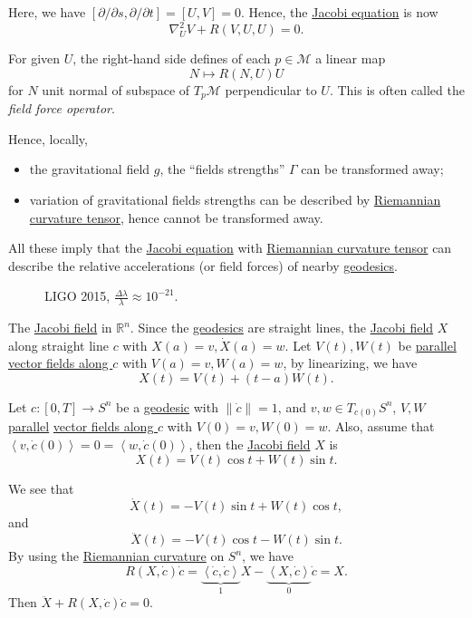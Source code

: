 Here, we have \([\partial / \partial s, \partial / \partial t] = [U, V] = 0 \). Hence, the \hyperref[eq:Jacobi]{Jacobi equation} is now
\[
	\nabla ^2_U V + R(V, U, U) = 0.
\]

For given \(U\), the right-hand side defines of each \(p\in \mathcal{M} \) a linear map
\[
	N \mapsto R(N, U)U
\]
for \(N\) unit normal of subspace of \(T_p \mathcal{M} \) perpendicular to \(U\). This is often called the \emph{field force operator}.

Hence, locally,
\begin{itemize}
	\item the gravitational field \(g\), the ``fields strengths'' \(\Gamma \) can be transformed away;
	\item variation of gravitational fields strengths can be described by \hyperref[def:Riemannian-curvature]{Riemannian curvature tensor}, hence cannot be transformed away.
\end{itemize}

All these imply that the \hyperref[eq:Jacobi]{Jacobi equation} with \hyperref[def:Riemannian-curvature]{Riemannian curvature tensor} can describe the relative accelerations (or field forces) of nearby \hyperref[def:geodesic]{geodesics}.
\begin{figure}[H]
	\centering
	\caption{LIGO 2015, \(\frac{\Delta \lambda }{\lambda } \approx 10^{-21}\).}
	\label{fig:LIGO}
\end{figure}

\begin{eg}[\(\mathbb{R} ^n\)]
	The \hyperref[def:Jacobi-field]{Jacobi field} in \(\mathbb{R} ^n\). Since the \hyperref[def:geodesic]{geodesics} are straight lines, the \hyperref[def:Jacobi-field]{Jacobi field} \(X\) along straight line \(c\) with \(X(a) = v, \dot{X}(a) = w\). Let \(V(t), W(t)\) be \hyperref[def:parallel]{parallel} \hyperref[def:vector-field-along-curve]{vector fields along \(c\)} with \(V(a) = v, W(a) = w\), by linearizing, we have
	\[
		X(t) = V(t) + (t-a) W(t).
	\]
\end{eg}

\begin{eg}
	Let \(c\colon [0, T] \to S^n\) be a \hyperref[def:geodesic]{geodesic} with \(\lVert \dot{c} \rVert = 1\), and \(v, w\in T_{c(0)}S^n\), \(V, W\) \hyperref[def:parallel]{parallel} \hyperref[def:vector-field-along-curve]{vector fields along \(c\)} with \(V(0) = v, W(0) = w\). Also, assume that \(\left\langle v, \dot{c} (0) \right\rangle = 0 = \left\langle w, \dot{c} (0) \right\rangle \), then the \hyperref[def:Jacobi-field]{Jacobi field} \(X\) is
	\[
		X(t) = V(t) \cos t + W(t) \sin t.
	\]
\end{eg}
\begin{explanation}
	We see that
	\[
		\dot{X}(t) = -V(t) \sin t + W(t) \cos t,
	\]
	and
	\[
		\ddot{X}(t) = -V(t)\cos t - W(t) \sin t.
	\]
	By using the \hyperref[def:Riemannian-curvature]{Riemannian curvature} on \(S^n\), we have
	\[
		R(X, \dot{c} )\dot{c}
		= \underbrace{\left\langle \dot{c}, \dot{c} \right\rangle}_{1} X - \underbrace{\left\langle X, \dot{c} \right\rangle }_{0} \dot{c}
		= X.
	\]
	Then \(\ddot{X} + R(X, \dot{c} )\dot{c} = 0\).
\end{explanation}

